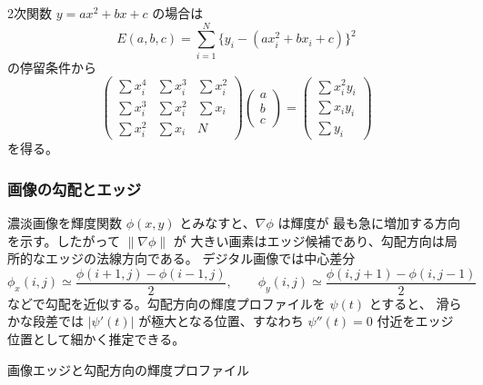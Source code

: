 2次関数 $y=ax^2+bx+c$ の場合は
\[
 E(a,b,c)=\sum_{i=1}^N\{y_i-(ax_i^2+bx_i+c)\}^2
\]
の停留条件から
\begin{equation}
 \begin{pmatrix}
 \sum x_i^4&\sum x_i^3&\sum x_i^2\\
 \sum x_i^3&\sum x_i^2&\sum x_i\\
 \sum x_i^2&\sum x_i&N
 \end{pmatrix}
 \begin{pmatrix}a\\b\\c\end{pmatrix}
 =
 \begin{pmatrix}\sum x_i^2y_i\\\sum x_iy_i\\\sum y_i\end{pmatrix}
\end{equation}
を得る。

\subsubsection{画像の勾配とエッジ}

濃淡画像を輝度関数 $\phi(x,y)$ とみなすと、$\nabla\phi$ は輝度が
最も急に増加する方向を示す。したがって $\lVert\nabla\phi\rVert$ が
大きい画素はエッジ候補であり、勾配方向は局所的なエッジの法線方向である。
デジタル画像では中心差分
\[
 \phi_x(i,j)\simeq\frac{\phi(i+1,j)-\phi(i-1,j)}2,\qquad
 \phi_y(i,j)\simeq\frac{\phi(i,j+1)-\phi(i,j-1)}2
\]
などで勾配を近似する。勾配方向の輝度プロファイルを $\psi(t)$ とすると、
滑らかな段差では $|\psi'(t)|$ が極大となる位置、すなわち
$\psi''(t)=0$ 付近をエッジ位置として細かく推定できる。

\begin{center}

\small 画像エッジと勾配方向の輝度プロファイル
\end{center}

